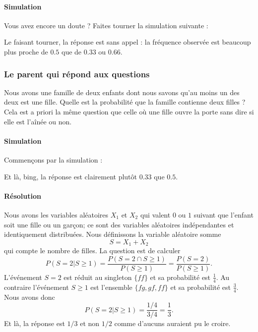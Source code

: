 \paragraph{Simulation}

Vous avez encore un doute ? Faites tourner la simulation suivante :


Le faisant tourner, la réponse est sans appel : la fréquence observée est beaucoup plus proche de \( 0.5\) que de \( 0.33\) ou \( 0.66\).

\subsubsection{Le parent qui répond aux questions}

Nous avons une famille de deux enfants dont nous savons qu'au moins un des deux est une fille. Quelle est la probabilité que la famille contienne deux filles ? Cela est a priori la même question que celle où une fille ouvre la porte sans dire si elle est l'aînée ou non.

\paragraph{Simulation}

Commençons par la simulation :



Et là, bing, la réponse est clairement plutôt \( 0.33\) que \( 0.5\).

\paragraph{Résolution}

Nous avons les variables aléatoires \( X_1\) et \( X_2\) qui valent \( 0\) ou \( 1\) suivant que l'enfant soit une fille ou un garçon; ce sont des variables aléatoires indépendantes et identiquement distribuées. Nous définissons la variable aléatoire somme
\begin{equation}
    S=X_1+X_2
\end{equation}
qui compte le nombre de filles. La question est de calculer
\begin{equation}
    P( S=2|S\geq 1 )=\frac{ P(S=2\cap S\geq 1) }{ P(S\geq 1) }=\frac{ P(S=2) }{ P(S\geq 1) }.
\end{equation}
L'événement \( S=2\) est réduit au singleton \( \{ ff \}\) et sa probabilité est \( \frac{1}{ 4 }\). Au contraire l'événement \( S\geq 1\) est l'ensemble \( \{ fg,gf,ff \}\) et sa probabilité est \( \frac{ 3 }{ 4 }\). Nous avons donc
\begin{equation}
    P( S=2|S\geq 1 )=\frac{ 1/4 }{ 3/4 }=\frac{1}{ 3 }.
\end{equation}
Et là, la réponse est \( 1/3\) et non \( 1/2\) comme d'aucuns auraient pu le croire.

